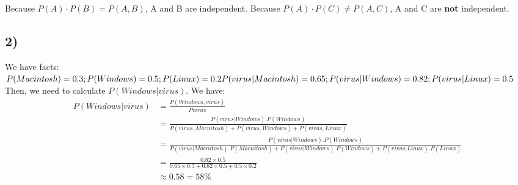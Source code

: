 \documentclass{article}
\begin{document}
Because $P(A)\cdot P(B) = P(A,B)$, A and B are independent. Because $P(A) \cdot P(C) \neq P(A,C)$, A and C are \textbf{not} independent.

\subsection*{2)} We have facts:\\
$
P(Macintosh) = 0.3; P(Windows) = 0.5; P(Linux) = 0.2\\
P(virus|Macintosh) = 0.65; P(virus|Windows) = 0.82; P(virus|Linux) = 0.5\\\\
$
Then, we need to calculate $P(Windows|virus)$. We have:\\
\begin{align*}
P(Windows|virus) &= \frac{P(Windows,virus)}{P{virus}}\\
&= \frac{P(virus|Windows).P(Windows)}{P(virus,Macnitosh) + P(virus, Windows) + P(virus, Linux)}\\
&= \frac{P(virus|Windows).P(Windows)}{P(virus|Macnitosh).P(Macnitosh) + P(virus|Windows).P(Windows) + P(virus|Linux).P(Linux)}\\
&= \frac{0.82 \times 0.5}{0.65 \times 0.3 + 0.82 \times 0.5 + 0.5 \times 0.2}\\
& \approx 0.58 = 58\%
\end{align*}
\end{document}
